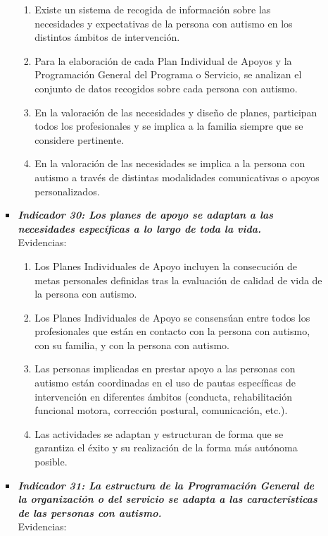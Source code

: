 \begin{itemize}
\begin{itemize}
\begin{itemize}
			\begin{enumerate}
				\item Existe un sistema de recogida de información sobre las necesidades y expectativas de la persona con autismo en los distintos ámbitos de intervención.
				\item Para la elaboración de cada Plan Individual de Apoyos y la Programación General del Programa o Servicio, se analizan el conjunto de datos recogidos sobre cada persona con autismo. 
				\item En la valoración de las necesidades y diseño de planes, participan todos los profesionales y se implica a la familia siempre que se considere pertinente. 
				\item En la valoración de las necesidades se implica a la persona con autismo a través de distintas modalidades comunicativas o apoyos personalizados. 
				 
			\end{enumerate}
			\item \textbf{\textit{Indicador 30: Los planes de apoyo se adaptan a las necesidades específicas a lo largo de toda la vida.}}\\Evidencias:
			
			\begin{enumerate}
				\item Los Planes Individuales de Apoyo incluyen la consecución de metas personales definidas tras la evaluación de calidad de vida de la persona con autismo. 
				\item Los Planes Individuales de Apoyo se consensúan entre todos los profesionales que están en contacto con la persona con autismo, con su familia, y con la persona con autismo. 
				\item Las personas implicadas en prestar apoyo a las personas con autismo están coordinadas en el uso de pautas específicas de intervención en diferentes ámbitos (conducta, rehabilitación funcional motora, corrección postural, comunicación, etc.). 
				\item Las actividades se adaptan y estructuran de forma que se garantiza el éxito y su realización de la forma más autónoma posible. 
			\end{enumerate}
			\item \textbf{\textit{Indicador 31: La estructura de la Programación General de la organización o del servicio se adapta a las características de las personas con autismo.}}\\Evidencias:
			

\end{itemize}
\end{itemize}
\end{itemize}
